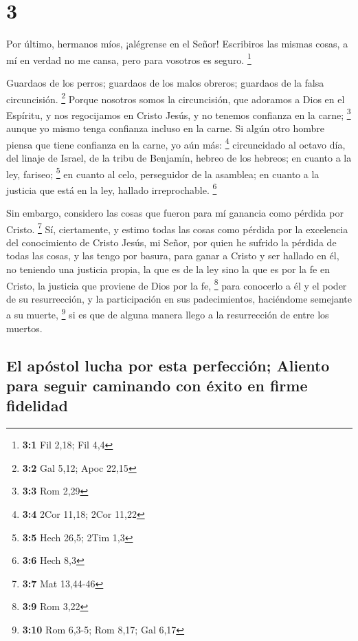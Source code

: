 \hypertarget{section-2}{%
\section{3}\label{section-2}}

 Por último, hermanos míos, ¡alégrense en el Señor!
Escribiros las mismas cosas, a mí en verdad no me cansa, pero para
vosotros es seguro. \footnote{\textbf{3:1} Fil 2,18; Fil 4,4}

 Guardaos de los perros; guardaos de los malos obreros;
guardaos de la falsa circuncisión. \footnote{\textbf{3:2} Gal 5,12; Apoc
  22,15}  Porque nosotros somos la circuncisión, que
adoramos a Dios en el Espíritu, y nos regocijamos en Cristo Jesús, y no
tenemos confianza en la carne; \footnote{\textbf{3:3} Rom 2,29}
 aunque yo mismo tenga confianza incluso en la carne. Si
algún otro hombre piensa que tiene confianza en la carne, yo aún más:
\footnote{\textbf{3:4} 2Cor 11,18; 2Cor 11,22} 
circuncidado al octavo día, del linaje de Israel, de la tribu de
Benjamín, hebreo de los hebreos; en cuanto a la ley, fariseo;
\footnote{\textbf{3:5} Hech 26,5; 2Tim 1,3}  en cuanto al
celo, perseguidor de la asamblea; en cuanto a la justicia que está en la
ley, hallado irreprochable. \footnote{\textbf{3:6} Hech 8,3}

 Sin embargo, considero las cosas que fueron para mí
ganancia como pérdida por Cristo. \footnote{\textbf{3:7} Mat 13,44-46}
 Sí, ciertamente, y estimo todas las cosas como pérdida
por la excelencia del conocimiento de Cristo Jesús, mi Señor, por quien
he sufrido la pérdida de todas las cosas, y las tengo por basura, para
ganar a Cristo  y ser hallado en él, no teniendo una
justicia propia, la que es de la ley sino la que es por la fe en Cristo,
la justicia que proviene de Dios por la fe, \footnote{\textbf{3:9} Rom
  3,22}  para conocerlo a él y el poder de su
resurrección, y la participación en sus padecimientos, haciéndome
semejante a su muerte, \footnote{\textbf{3:10} Rom 6,3-5; Rom 8,17; Gal
  6,17}  si es que de alguna manera llego a la
resurrección de entre los muertos.

\hypertarget{el-apuxf3stol-lucha-por-esta-perfecciuxf3n-aliento-para-seguir-caminando-con-uxe9xito-en-firme-fidelidad}{%
\subsection{El apóstol lucha por esta perfección; Aliento para seguir
caminando con éxito en firme
fidelidad}\label{el-apuxf3stol-lucha-por-esta-perfecciuxf3n-aliento-para-seguir-caminando-con-uxe9xito-en-firme-fidelidad}}

